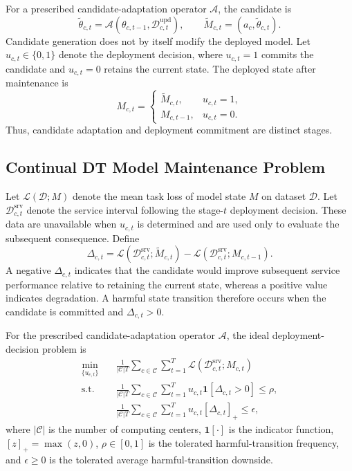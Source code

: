 For a prescribed candidate-adaptation operator $\mathcal A$, the candidate is
\begin{equation}
\widetilde{\theta}_{c,t}
=\mathcal A\!\left(\theta_{c,t-1},\mathcal D^{\mathrm{upd}}_{c,t}\right),
\qquad
\widetilde M_{c,t}=(a_c,\widetilde{\theta}_{c,t}).
\label{eq:candidate}
\end{equation}
Candidate generation does not by itself modify the deployed model. Let $u_{c,t}\in\{0,1\}$ denote the deployment decision, where $u_{c,t}=1$ commits the candidate and $u_{c,t}=0$ retains the current state. The deployed state after maintenance is
\begin{equation}
M_{c,t}=
\begin{cases}
\widetilde M_{c,t}, & u_{c,t}=1,\\
M_{c,t-1}, & u_{c,t}=0.
\end{cases}
\label{eq:commit-state}
\end{equation}
Thus, candidate adaptation and deployment commitment are distinct stages.

\subsection{Continual DT Model Maintenance Problem}
Let $\mathcal L(\mathcal D;M)$ denote the mean task loss of model state $M$ on dataset $\mathcal D$. Let $\mathcal D^{\mathrm{srv}}_{c,t}$ denote the service interval following the stage-$t$ deployment decision. These data are unavailable when $u_{c,t}$ is determined and are used only to evaluate the subsequent consequence. Define
\begin{equation}
\Delta_{c,t}
=\mathcal L\!\left(\mathcal D^{\mathrm{srv}}_{c,t};\widetilde M_{c,t}\right)
-\mathcal L\!\left(\mathcal D^{\mathrm{srv}}_{c,t};M_{c,t-1}\right).
\label{eq:delta}
\end{equation}
A negative $\Delta_{c,t}$ indicates that the candidate would improve subsequent service performance relative to retaining the current state, whereas a positive value indicates degradation. A harmful state transition therefore occurs when the candidate is committed and $\Delta_{c,t}>0$.

For the prescribed candidate-adaptation operator $\mathcal A$, the ideal deployment-decision problem is
\begin{equation}
\begin{aligned}
\min_{\{u_{c,t}\}}\quad
&\frac{1}{|\mathcal C|T}
\sum_{c\in\mathcal C}\sum_{t=1}^{T}
\mathcal L\!\left(\mathcal D^{\mathrm{srv}}_{c,t};M_{c,t}\right)\\
\mathrm{s.t.}\quad
&\frac{1}{|\mathcal C|T}
\sum_{c\in\mathcal C}\sum_{t=1}^{T}
 u_{c,t}\mathbf 1[\Delta_{c,t}>0]\leq \rho,\\
&\frac{1}{|\mathcal C|T}
\sum_{c\in\mathcal C}\sum_{t=1}^{T}
 u_{c,t}[\Delta_{c,t}]_{+}\leq \epsilon,
\end{aligned}
\label{eq:ideal-problem}
\end{equation}
where $|\mathcal C|$ is the number of computing centers, $\mathbf 1[\cdot]$ is the indicator function, $[z]_{+}=\max(z,0)$, $\rho\in[0,1]$ is the tolerated harmful-transition frequency, and $\epsilon\geq0$ is the tolerated average harmful-transition downside.

